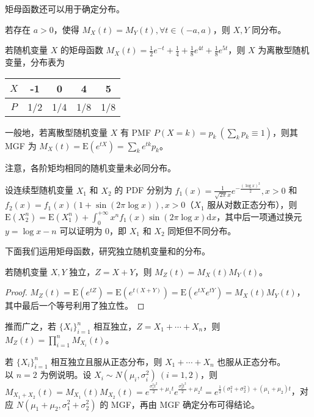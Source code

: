 \documentclass[../main.tex]{subfiles}
\begin{document}
矩母函数还可以用于确定分布。

\begin{theorem}\label{thm:4.6.2}
若存在 $a>0$，使得 $M_X(t)=M_Y(t),\forall t\in(-a,a)$，则 $X,Y$ 同分布。
\end{theorem}

\begin{example}
若随机变量 $X$ 的矩母函数 $M_X(t)=\frac12e^{-t}+\frac14+\frac18e^{4t}+\frac18e^{5t}$，则 $X$ 为离散型随机变量，分布表为

\bigskip
\begin{tabular}{|c|c|c|c|c|}
\hline
$X$ & -1 & 0 & 4 & 5\\
\hline
$P$ & 1/2 & 1/4 & 1/8 & 1/8\\
\hline
\end{tabular}
\bigskip

一般地，若离散型随机变量 $X$ 有 PMF $P(X=k)=p_k\ (\sum_k p_k\equiv1)$，则其 MGF 为 $M_X(t)=\mathrm E(e^{tX})=\sum_ke^{tk}p_k$。
\end{example}

注意，各阶矩均相同的随机变量未必同分布。

\begin{example}
设连续型随机变量 $X_1$ 和 $X_2$ 的 PDF 分别为 $f_1(x)=\frac{1}{\sqrt{2\pi}x}e^{-\frac{(\log x)^2}{2}},x>0$ 和 $f_2(x)=f_1(x)(1+\sin(2\pi\log x)),x>0$（$X_1$ 服从对数正态分布），则 $\mathrm E(X_2^n)=\mathrm E(X_1^n)+\int_0^{+\infty}x^nf_1(x)\sin(2\pi\log x)\mathrm dx$，其中后一项通过换元 $y=\log x-n$ 可以证明为 $0$，即 $X_1$ 和 $X_2$ 同矩但不同分布。
\end{example}

下面我们运用矩母函数，研究独立随机变量和的分布。

\begin{theorem}\label{thm:4.6.3}
若随机变量 $X,Y$ 独立，$Z=X+Y$，则 $M_Z(t)=M_X(t)M_Y(t)$。
\end{theorem}

\begin{proof}
$M_Z(t)=\mathrm E(e^{tZ})=\mathrm E(e^{t(X+Y)})=\mathrm E(e^{tX}e^{tY})=M_X(t)M_Y(t)$，其中最后一个等号利用了独立性。
\end{proof}

推而广之，若 $\{X_i\}_{i=1}^n$ 相互独立，$Z=X_1+\cdots+X_n$，则 $M_Z(t)=\prod_{i=1}^nM_{X_i}(t)$。

\begin{example}
若 $\{X_i\}_{i=1}^n$ 相互独立且服从正态分布，则 $X_1+\cdots+X_n$ 也服从正态分布。\\
以 $n=2$ 为例说明。设 $X_i\sim N(\mu_i,\sigma_i^2)\ (i=1,2)$，则 $M_{X_1+X_2}(t)=M_{X_1}(t)M_{X_2}(t)=e^{\frac{\sigma_1^2t^2}2+\mu_1t}e^{\frac{\sigma_2^2t^2}2+\mu_2t}=e^{\frac12(\sigma_1^2+\sigma_2^2)+(\mu_1+\mu_2)t}$，对应 $N(\mu_1+\mu_2,\sigma_1^2+\sigma_2^2)$ 的 MGF，再由 MGF 确定分布可得结论。
\end{example}
\end{document}
